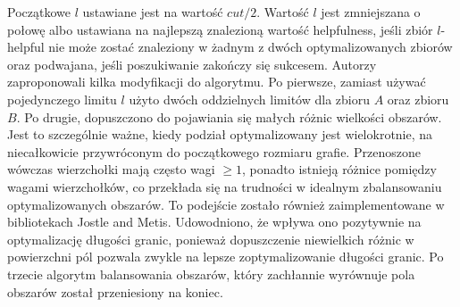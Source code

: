 Początkowe $l$ ustawiane jest na wartość $cut/2$.
Wartość $l$ jest zmniejszana o połowę albo ustawiana na najlepszą znalezioną wartość helpfulness, jeśli zbiór $l$-helpful
nie może zostać znaleziony w żadnym z dwóch optymalizowanych zbiorów oraz podwajana, jeśli poszukiwanie
zakończy się sukcesem.
Autorzy \cite{1364754} zaproponowali kilka modyfikacji do algorytmu.
Po pierwsze, zamiast używać pojedynczego limitu $l$ użyto dwóch oddzielnych limitów dla zbioru $A$ oraz zbioru $B$.
Po drugie, dopuszczono do pojawiania się małych różnic wielkości obszarów.
Jest to szczególnie ważne, kiedy podział optymalizowany jest wielokrotnie, na niecałkowicie przywróconym
do początkowego rozmiaru grafie.
Przenoszone wówczas wierzchołki mają często wagi $\geq 1$, ponadto istnieją różnice pomiędzy wagami wierzchołków,
co przekłada się na trudności w idealnym zbalansowaniu optymalizowanych obszarów.
To podejście zostało również zaimplementowane w bibliotekach Jostle and Metis.
Udowodniono, że wpływa ono pozytywnie na optymalizację długości granic, ponieważ dopuszczenie niewielkich
różnic w powierzchni pól pozwala zwykle na lepsze zoptymalizowanie długości granic.
Po trzecie algorytm balansowania obszarów, który zachłannie wyrównuje pola obszarów został przeniesiony na koniec.

